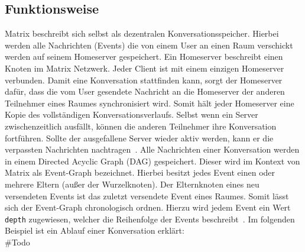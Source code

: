     \subsection{Funktionsweise}\label{subsec:funktionsweise}
    Matrix beschreibt sich selbst als dezentralen Konversationsspeicher\cite{matrix}.
    Hierbei werden alle Nachrichten (Events) die von einem User an einen Raum verschickt werden auf seinem Homeserver gespeichert.
    Ein Homeserver beschreibt einen Knoten im Matrix Netzwerk.
    Jeder Client ist mit einem einzigen Homeserver verbunden.
    Damit eine Konversation stattfinden kann, sorgt der Homeserver dafür, dass die vom User gesendete Nachricht an die Homeserver der anderen Teilnehmer eines Raumes synchronisiert wird.
    Somit hält jeder Homeserver eine Kopie des vollständigen Konversationsverlaufs.
    Selbst wenn ein Server zwischenzeitlich ausfällt, können die anderen Teilnehmer ihre Konversation fortführen.
    Sollte der ausgefallene Server wieder aktiv werden, kann er die verpassten Nachrichten nachtragen~\cite{matrix}.
    Alle Nachrichten einer Konversation werden in einem Directed Acyclic Graph (DAG) gespeichert.
    Dieser wird im Kontext von Matrix als Event-Graph bezeichnet.
    Hierbei besitzt jedes Event einen oder mehrere Eltern (außer der Wurzelknoten).
    Der Elternknoten eines neu versendeten Events ist das zuletzt versendete Event eines Raumes.
    Somit lässt sich der Event-Graph chronologisch ordnen.
    Hierzu wird jedem Event ein Wert \texttt{depth} zugewiesen, welcher die Reihenfolge der Events beschreibt~\cite{eventgraph}.
    Im folgenden Beispiel ist ein Ablauf einer Konversation erklärt:\\

    \#Todo

%    

    \newpage
